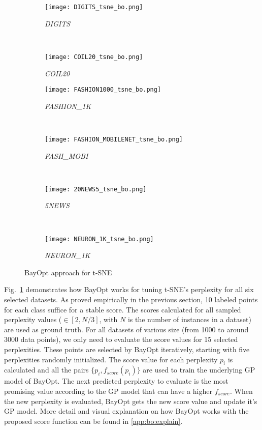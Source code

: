 \begin{figure}%
    \begin{subfigure}[b]{.46\linewidth}
        \centering
        \texttt{[image: DIGITS\_tsne\_bo.png]}
        \caption{\emph{DIGITS}}
    \end{subfigure}
    ~
    \begin{subfigure}[b]{.46\linewidth}
        \centering
        \texttt{[image: COIL20\_tsne\_bo.png]}
        \caption{\emph{COIL20}}
    \end{subfigure}
    \vfill
    \begin{subfigure}[b]{.46\linewidth}
        \centering
        \texttt{[image: FASHION1000\_tsne\_bo.png]}
        \caption{\emph{FASHION\_1K}}
    \end{subfigure}
    ~
    \begin{subfigure}[b]{.46\linewidth}
        \centering
        \texttt{[image: FASHION\_MOBILENET\_tsne\_bo.png]}
        \caption{\emph{FASH\_MOBI}}
    \end{subfigure}
    ~
    \vfill
    \begin{subfigure}[b]{.46\linewidth}
        \centering
        \texttt{[image: 20NEWS5\_tsne\_bo.png]}
        \caption{\emph{5NEWS}}
    \end{subfigure}
    ~
    \begin{subfigure}[b]{.46\linewidth}
        \centering
        \texttt{[image: NEURON\_1K\_tsne\_bo.png]}
        \caption{\emph{NEURON\_1K}}
    \end{subfigure}
    \caption{BayOpt approach for  t-SNE}
    \label{fig:tsne:bo:all}
\end{figure}

Fig.~\ref{fig:tsne:bo:all} demonstrates how BayOpt works for tuning t-SNE's perplexity for all six selected datasets.
As proved empirically in the previous section, 10 labeled points for each class suffice for a stable score.
The scores calculated for all sampled perplexity values ($\in [2, N/3]$, with $N$ is the number of instances in a dataset) are used as ground truth.
For all datasets of various size (from 1000 to around 3000 data points), we only need to evaluate the score values for 15 selected perplexities.
These points are selected by BayOpt iteratively, starting with five perplexities randomly initialized.
The score value for each perplexity $p_i$ is calculated and all the pairs $\{p_i, f_{score}(p_i)\}$ are used to train the underlying GP model of BayOpt.
The next predicted perplexity to evaluate is the most promising value according to the GP model that can have a higher $f_{score}$.
When the new perplexity is evaluated, BayOpt gets the new score value and update it's GP model.
More detail and visual explanation on how BayOpt works with the proposed score function can be found in \ref{app:bo:explain}.

